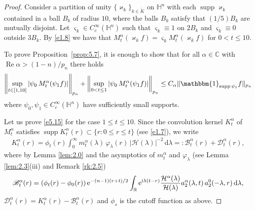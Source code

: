 \documentclass[11pt]{amsproc}
\newcommand{\R}{\mathbb{R}}
\newcommand{\e}{\mathrm{e}}
\newcommand{\indicator}{\mathbbm{1}}
\newcommand{\supp}{\mathop{\mathrm{supp}}}
\newcommand{\0}{\mathbf{0}}
\newcommand{\bc}{{ \mathcal{H} }}
\newcommand{\CC}{\mathbb{C}}
\renewcommand{\Re}{\mathop{\mathrm{Re}}}
\renewcommand{\H}{\mathbb{H}}
\renewcommand{\i}{\mathrm{i}}
\renewcommand{\d}{\mathrm{d}}
\numberwithin{equation}{section}
\numberwithin{figure}{section}
\theoremstyle{definition}
\theoremstyle{remark}
\numberwithin{thm}{section}
\begin{document}
\begin{proof}
Consider a partition of unity $\{ \varkappa_k\}_{k\in\widetilde{K}}$ on $\H^n$ with each $\supp \varkappa_k$ contained in a ball $B_k$ of radius $10$, where the balls $B_k$ satisfy that $(1/5)B_k$ are mutually disjoint. %
Let $\varsigma_k\in C_c^\infty(\H^n)$ such that $\varsigma_k\equiv 1$ on $2B_k$ and $\varsigma_k\equiv 0$ outside $3B_k$. By \eqref{e1.8} we have that  $M^\alpha_t( \varkappa_kf)=\varsigma_kM^\alpha_t( \varkappa_kf)$ for  $0<t\leq 10$.

To prove Proposition~\ref{prop:5.7},   it is enough to show that for all $\alpha\in\CC$ with $\Re\alpha>(1-n)/p_n$ there holds
\begin{eqnarray}\label{e5.15}
\left\|\sup_{t\in[1,10]}|\psi_0\,M^\alpha_t( \psi_1f)|\right\|_{p_n}
+ \left\|\sup_{0<t\leq 1}|\psi_0\,M^\alpha_t( \psi_1f)|\right\|_{p_n} \leq C_\alpha\|\indicator_{\supp\psi_1}f\|_{p_n}
\end{eqnarray}
where $\psi_0,\psi_1\in C^\infty_c(\H^n)$ have sufficiently small supports.


\medskip

Let us prove \eqref{e5.15} for the case $1\leq t\leq 10$. Since the convolution kernel $K^\alpha_t$ of $M^\alpha_t$ satisfies $\supp K^\alpha_t(r)\subset \{r:0\leq r\leq t\}$ (see \eqref{e1.7}), we  write
\begin{eqnarray*}
K^\alpha_t(r) =\phi_t(r)\int_0^\infty m^\alpha_t(\lambda)\,\varphi_\lambda(r)\,|\bc(\lambda)|^{-2}\,\d\lambda=:\mathscr{B}^\alpha_t(r)+\mathscr{D}^\alpha_t(r),
\end{eqnarray*}
where by Lemma \ref{lem:2.0} and the asymptotics of $m^\alpha_t$ and $\varphi_\lambda$ (see Lemma \ref{lem:2.3}(iii) and Remark \ref{rk:2.5})
\begin{eqnarray}\label{e5.160}
\mathscr{B}^\alpha_t(r)=(\phi_t(r)-\phi_0(r))\,\e^{-(n-1)(r+t)/2}\int_\R\e^{\i\lambda(t-r)}{\bc^\alpha(\lambda)\over\bc(\lambda)}a^\alpha_2(\lambda,t)\,a^0_2(-\lambda,r)\,\d\lambda,
\end{eqnarray}
$\mathscr{D}^\alpha_t(r)=K^\alpha_t(r)-\mathscr{B}^\alpha_t(r)$ and $\phi_s$ is the cutoff function as above.


\end{proof}
\end{document}
